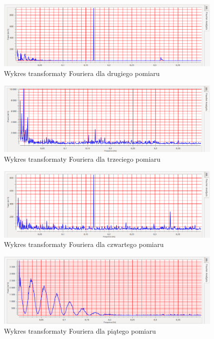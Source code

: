 \vspace{5mm}

\begin{figure}[ht]
\centering
\includegraphics[scale=0.35]{HRV1/foty/103/fourier2.png}
\caption{Wykres transformaty Fouriera dla drugiego pomiaru}
\label{fig:four2}
\end{figure}



\begin{figure}[ht]
\centering
\includegraphics[scale=0.35]{HRV1/foty/106/fourier3.png}
\caption{Wykres transformaty Fouriera dla trzeciego pomiaru}
\label{fig:four3}
\end{figure}

\vspace{5mm}

\begin{figure}[H]
\centering
\includegraphics[scale=0.35]{HRV1/foty/111/fourier4.png}
\caption{Wykres transformaty Fouriera dla czwartego pomiaru}
\label{fig:four4}
\end{figure}

\vspace{5mm}

\begin{figure}[H]
\centering
\includegraphics[scale=0.35]{HRV1/foty/116/fourier5.png}
\caption{Wykres transformaty Fouriera dla piątego pomiaru}
\label{fig:four5}
\end{figure}





